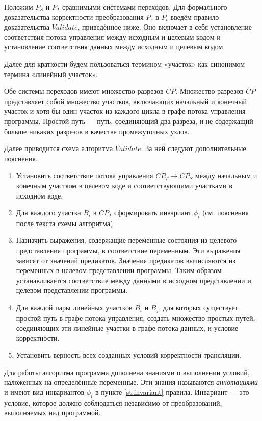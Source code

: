 Положим $P_{S}$ и $P_{T}$ сравнимыми системами переходов. Для формального доказательства корректности преобразования $P_{s}$ в $P_{t}$ введём правило доказательства $Validate$, приведённое ниже. Оно включает в себя установление соответствия потока управления между исходным и целевым кодом и установление соответствия данных между исходным и целевым кодом.

Далее для краткости будем пользоваться термином «участок» как синонимом термина «линейный участок».

Обе системы переходов имеют множество разрезов $CP$. Множество разрезов $CP$ представляет собой множество участков, включающих начальный и конечный участок и хотя бы один участок из каждого цикла в графе потока управления программы. Простой путь --- путь, соединяющий два разреза, и не содержащий больше никаких разрезов в качестве промежуточных узлов.

Далее приводится схема алгоритма $Validate$. За ней следуют дополнительные пояснения.

\begin{enumerate}
    \item Установить соответствие потока управления $CP_{T} \rightarrow CP_{S}$ между начальным и конечным участком в целевом коде и соответствующими участками в исходном коде.
    \item Для каждого участка $B_{i}$ в $CP_{T}$ сформировать инвариант $\phi_{i}$ (см. пояснения после текста схемы алгоритма). \label{st:invariant}
    \item Назначить выражения, содержащие переменные состояния из целевого представления программы, в соответствие переменным. Эти выражения зависят от значений предикатов. Значения предикатов вычисляются из переменных в целевом представлении программы. Таким образом устанавливается соответствие между данными в исходном представлении и целевом представлении программы.
    \item Для каждой пары линейных участков $B_{i}$ и $B_{j}$, для которых существует простой путь в графе потока управления, создать множество простых путей, соединяющих эти линейные участки в графе потока данных, и условие корректности.
    \item Установить верность всех созданных условий корректности трансляции.
\end{enumerate}

Для работы алгоритма программа дополнена знаниями о выполнении условий, наложенных на определённые переменные. Эти знания называются \emph{аннотациями} и имеют вид инвариантов $\phi_{i}$ в пункте \ref{st:invariant} правила. Инвариант --- это условие, которое должно соблюдаться независимо от преобразований, выполняемых над программой.

